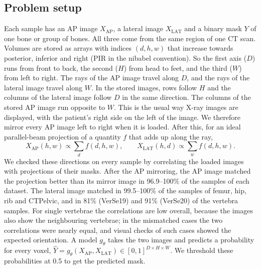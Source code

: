 \documentclass[11pt]{article}
\newcommand{\AP}{\mathrm{AP}}
\newcommand{\LAT}{\mathrm{LAT}}
\begin{document}
\subsection{Problem setup}\label{sec:problem}
Each sample has an AP image $X_\AP$, a lateral image $X_\LAT$ and a binary mask $Y$ of one bone or group of bones. All three come from the same region of one CT scan. Volumes are stored as arrays with indices $(d,h,w)$ that increase towards posterior, inferior and right (PIR in the nibabel convention). So the first axis ($D$) runs from front to back, the second ($H$) from head to feet, and the third ($W$) from left to right. The rays of the AP image travel along $D$, and the rays of the lateral image travel along $W$. In the stored images, rows follow $H$ and the columns of the lateral image follow $D$ in the same direction. The columns of the stored AP image run opposite to $W$. This is the usual way X-ray images are displayed, with the patient's right side on the left of the image. We therefore mirror every AP image left to right when it is loaded. After this, for an ideal parallel-beam projection of a quantity $f$ that adds up along the ray,
\begin{equation}
X_\AP(h,w)\propto\sum_{d} f(d,h,w),\qquad X_\LAT(h,d)\propto\sum_{w} f(d,h,w).
\label{eq:projection}
\end{equation}
We checked these directions on every sample by correlating the loaded images with projections of their masks. After the AP mirroring, the AP image matched the projection better than its mirror image in 96.9--100\% of the samples of each dataset. The lateral image matched in 99.5--100\% of the samples of femur, hip, rib and CTPelvic, and in 81\% (VerSe19) and 91\% (VerSe20) of the vertebra samples. For single vertebrae the correlations are low overall, because the images also show the neighbouring vertebrae; in the mismatched cases the two correlations were nearly equal, and visual checks of such cases showed the expected orientation.
A model $g_\theta$ takes the two images and predicts a probability for every voxel, $\hat Y=g_\theta(X_\AP,X_\LAT)\in[0,1]^{D\times H\times W}$. We threshold these probabilities at 0.5 to get the predicted mask.
\end{document}
